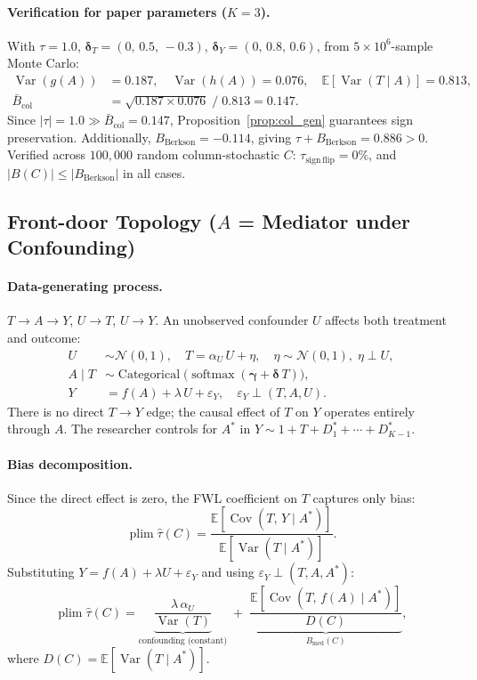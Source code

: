 \paragraph{Verification for paper parameters ($K{=}3$).}
With $\tau{=}1.0$, $\boldsymbol{\delta}_T{=}(0,\,0.5,\,{-}0.3)$, $\boldsymbol{\delta}_Y{=}(0,\,0.8,\,0.6)$, from $5{\times}10^6$-sample Monte Carlo:
\begin{align*}
  \operatorname{Var}(g(A)) &= 0.187,\quad
  \operatorname{Var}(h(A)) = 0.076,\quad
  \mathbb{E}[\operatorname{Var}(T\mid A)] = 0.813,\\
  \bar{B}_{\mathrm{col}} &= \sqrt{0.187\times 0.076}\;/\;0.813 = 0.147.
\end{align*}
Since $|\tau|{=}1.0\gg\bar{B}_{\mathrm{col}}{=}0.147$, Proposition~\ref{prop:col_gen} guarantees sign preservation.
Additionally, $B_{\mathrm{Berkson}}{=}{-}0.114$, giving $\tau+B_{\mathrm{Berkson}}{=}0.886{>}0$.
Verified across $100{,}000$ random column-stochastic $C$: $\tau_{\mathrm{sign\,flip}}{=}0\%$, and $|B(C)|\leq|B_{\mathrm{Berkson}}|$ in all cases.

\subsection{Front-door Topology ($A$ = Mediator under Confounding)}
\label{app:frontdoor}

\paragraph{Data-generating process.}
$T\to A\to Y$, $U\to T$, $U\to Y$.
An unobserved confounder $U$ affects both treatment and outcome:
\begin{align*}
  U &\sim \mathcal{N}(0,1),\quad
  T = \alpha_U\,U + \eta,\quad \eta\sim\mathcal{N}(0,1),\;\eta\perp U,\\
  A\mid T &\sim \operatorname{Categorical}\bigl(\operatorname{softmax}(\boldsymbol{\gamma}+\boldsymbol{\delta}\,T)\bigr),\\
  Y &= f(A) + \lambda\,U + \varepsilon_Y,\quad \varepsilon_Y\perp(T,A,U).
\end{align*}
There is no direct $T{\to}Y$ edge; the causal effect of $T$ on $Y$ operates entirely through $A$.
The researcher controls for $A^*$ in $Y\sim 1+T+D_1^*+\cdots+D_{K-1}^*$.

\paragraph{Bias decomposition.}
Since the direct effect is zero, the FWL coefficient on $T$ captures only bias:
\[
  \operatorname{plim}\hat\tau(C) = \frac{\mathbb{E}[\operatorname{Cov}(T,\,Y\mid A^*)]}{\mathbb{E}[\operatorname{Var}(T\mid A^*)]}.
\]
Substituting $Y=f(A)+\lambda U+\varepsilon_Y$ and using $\varepsilon_Y\perp(T,A,A^*)$:
\begin{equation}
  \operatorname{plim}\hat\tau(C)
  = \underbrace{\frac{\lambda\,\alpha_U}{\operatorname{Var}(T)}}_{\text{confounding (constant)}}
  \;+\; \underbrace{\frac{\mathbb{E}[\operatorname{Cov}(T,\,f(A)\mid A^*)]}{D(C)}}_{\displaystyle B_{\mathrm{med}}(C)},
  \label{eq:fd_decomp}
\end{equation}
where $D(C)=\mathbb{E}[\operatorname{Var}(T\mid A^*)]$.

